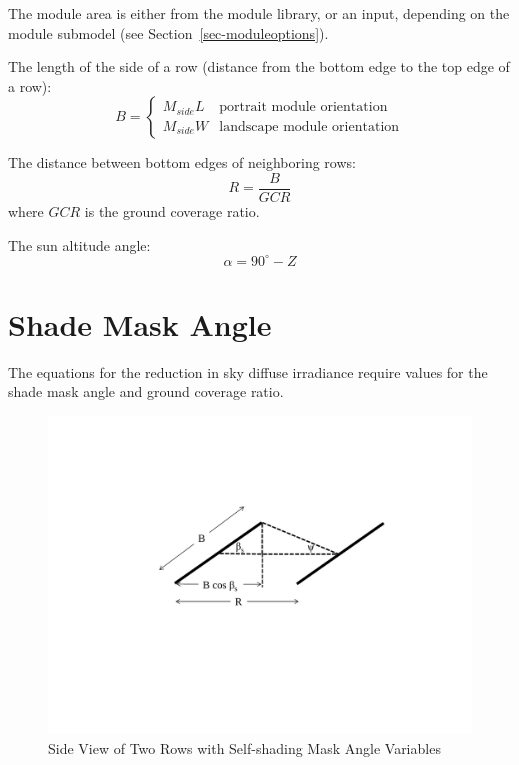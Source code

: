 \documentclass[12pt,letterpaper]{article}
\newcommand\GCR{\ensuremath{\mathit{GCR}}}
\begin{document}
The module area is either from the module library, or an input, depending on the module submodel (see Section~\ref{sec-moduleoptions}).

The length of the side of a row (distance from the bottom edge to the top edge of a row):
\[
B=
  \left\{
    \begin{array}{ll}
      M_{side} L & \mbox{portrait module orientation}\\
      M_{side} W & \mbox{landscape module orientation}
    \end{array}
  \right.
\]

The distance between bottom edges of neighboring rows:
\begin{equation}
R = \frac{B}{\GCR} 
\end{equation}
where $\GCR$ is the ground coverage ratio.

The sun altitude angle:
\begin{equation}
\alpha = 90^\circ-Z
\end{equation}

\section{Shade Mask Angle}

The equations for the reduction in sky diffuse irradiance require values for the shade mask angle and ground coverage ratio.

\begin{figure}
\begin{center}
\includegraphics[scale=0.66]{self-shading-mask-angle}
\caption{Side View of Two Rows with Self-shading Mask Angle Variables}
\label{fig-selfshadingmaskangle}
\end{center}
\end{figure}
\end{document}
